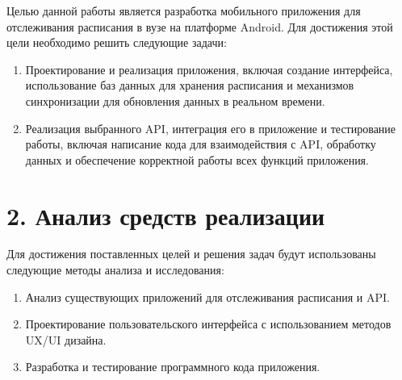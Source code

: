 \documentclass{vsureport}
\begin{document}
Целью данной работы является разработка мобильного приложения для отслеживания расписания в вузе на платформе Android. Для достижения этой цели необходимо решить следующие задачи:

\begin{enumerate}
	\item Проектирование и реализация приложения, включая создание интерфейса, использование баз данных для хранения расписания и механизмов синхронизации для обновления данных в реальном времени.
	
	\item Реализация выбранного API, интеграция его в приложение и тестирование работы, включая написание кода для взаимодействия с API, обработку данных и обеспечение корректной работы всех функций приложения.
\end{enumerate}

\newpage

\section*{2. Анализ средств реализации}

Для достижения поставленных целей и решения задач будут использованы следующие методы анализа и исследования:
\begin{enumerate}
\item Анализ существующих приложений для отслеживания расписания и API.
\item Проектирование пользовательского интерфейса с использованием методов UX/UI дизайна.
\item Разработка и тестирование программного кода приложения.
\end{enumerate}
\end{document}
